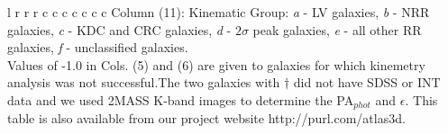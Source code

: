\documentclass[usenatbib,usegraphicx]{mn2e}
\begin{document}
\begin{deluxetable}{l  r  r  r  c  c  c  c  c  c c}
{Column (11): Kinematic Group: {\it a} - LV galaxies, {\it b} - NRR galaxies, {\it c} - KDC and CRC galaxies, {\it d} - $2\sigma$ peak galaxies, {\it e} - all other RR galaxies, {\it f} - unclassified galaxies.   \\
Values of -1.0 in Cols. (5) and (6) are given to galaxies for which kinemetry analysis was not successful.The two galaxies with $\dagger$ did not have SDSS or INT data and we used 2MASS K-band images to determine the PA$_{phot}$ and $\epsilon$. This table is also available from our project website http://purl.com/atlas3d.
}
\label{t:master}
\end{deluxetable}





\label{lastpage}
\end{document}
